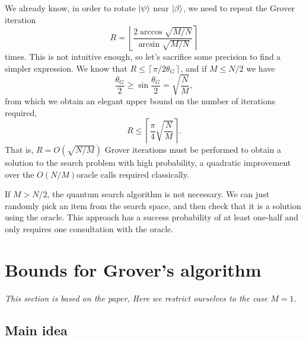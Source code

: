 \documentclass[a4paper,10pt]{book}
\numberwithin{equation}{section}
\begin{document}
We already know, in order to rotate $\ket{\psi}$ near $\ket{\beta}$, we need to repeat the Grover iteration
\begin{equation}\label{eq:IterationsGrover}
    R=\left\lfloor\frac{2\arccos\sqrt{M/N}}{\arcsin\sqrt{M/N}}\right\rceil
\end{equation}
times. This is not intuitive enough, so let's sacrifice some precision to find a simpler expression. We know that $R\leq\left\lceil\pi/2\theta_{G}\right\rceil$, and if $M\leq N/2$ we have
\begin{equation}
    \frac{\theta_{G}}{2}\geq\sin\frac{\theta_{G}}{2}=\sqrt{\frac{N}{M}},
\end{equation}
from which we obtain an elegant upper bound on the number of iterations required,
\begin{equation}
    R\leq\left\lceil\frac{\pi}{4}\sqrt{\frac{N}{M}}\right\rceil.
\end{equation}
That is, $R=O(\sqrt{N/M})$ Grover iterations must be performed to obtain a solution to the search problem with high probability, a quadratic improvement over the $O(N/M)$oracle calls required classically.

If $M>N/2$, the quantum search algorithm is not necessary. We can just randomly pick an item from the search space, and then check that it is a solution using the oracle. This approach has a success probability of at least one-half and only requires one consultation with the oracle.



\section{Bounds for Grover's algorithm\label{sec:BoundForGrover}}

\textit{This section is based on the paper\cite{2009Exact}, Here we restrict ourselves to the case $M=1$.}

\subsection{Main idea}
\end{document}
